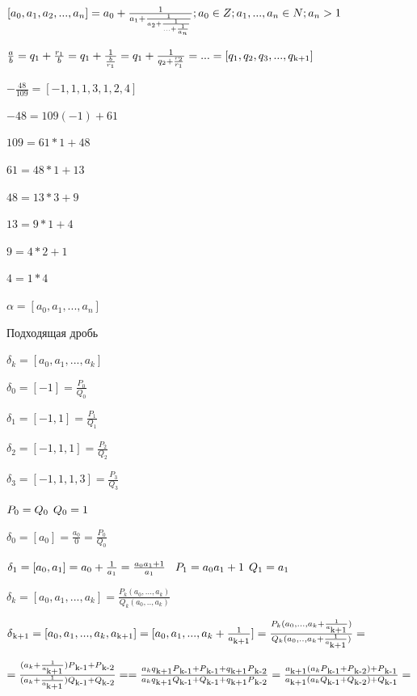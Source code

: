 \documentclass[12pt]{article}
\begin{document}
$[a_0,a_1,a_2,...,a_n] = a_0 + \frac{1}{a_1 + \frac{1}{a_2 + \frac{1}{... + \frac{1}{a_n}}}}; a_0 \in Z; a_1,...,a_n \in N; a_n > 1
\vspace{1 ex}$

$\frac{a}{b} = q_1 + \frac{r_1}{b} = q_1 + \frac{1}{\frac{b}{r_1}} = q_1 + \frac{1}{q_2 + \frac{r_2}{r_1}} = ... = [q_1,q_2,q_3,...,q\textsubscript{k+1}] \vspace{2 ex}$

$-\frac{48}{109} = [-1,1,1,3,1,2,4] $

$-48 = 109(-1) + 61$

$109 = 61*1 +48$

$61 = 48*1 + 13$

$48 = 13*3 + 9$

$13 = 9*1 + 4$

$9 = 4*2+1$

$4=1*4$

$\alpha = [a_0,a_1,...,a_n]$

Подходящая дробь

$\delta_k = [a_0,a_1,...,a_k]$

$\delta_0 = [-1] = \frac{P_0}{Q_0}$

$\delta_1 = [-1,1] = \frac{P_1}{Q_1}$

$\delta_2 = [-1,1,1] = \frac{P_2}{Q_2}$

$\delta_3 = [-1,1,1,3] = \frac{P_3}{Q_3}$

$P_0 = Q_0 \hspace{1 ex } Q_0 = 1$

$\delta_0 = [a_0] = \frac{a_0}{0} = \frac{P_0}{Q_0}$

$\delta_1 = [a_0, a_1] = a_0 + \frac{1}{a_1} = \frac{a_0 a_1 +1}{a_1} \hspace{2 ex} P_1 = a_0 a_1 +1 \hspace{1 ex} Q_1 = a_1$

$\delta_k = [a_0,a_1,...,a_k] = \frac{P_k(a_0,...,a_k)}{Q_k(a_0,..,a_k)}$

$\delta\textsubscript{k+1} = [a_0,a_1,...,a_k,a\textsubscript{k+1}] =[a_0,a_1,...,a_k+\frac{1}{ a\textsubscript{k+1}}] =  \frac{P_k(a_0,...,a_k+\frac{1}{ a\textsubscript{k+1}} )}{Q_k(a_0,..,a_k+\frac{1}{ a\textsubscript{k+1}})} = \vspace{2 ex}$

$= \frac{(a_k + \frac{1}{a\textsubscript{k+1}}) P\textsubscript{k-1} + P\textsubscript{k-2}}{(a_k + \frac{1}{a\textsubscript{k+1}}) Q\textsubscript{k-1} + Q\textsubscript{k-2}} =
= \frac{a_k q\textsubscript{k+1} P\textsubscript{k-1} + P\textsubscript{k-1} + q\textsubscript{k+1} P\textsubscript{k-2}}{a_k q\textsubscript{k+1} Q\textsubscript{k-1} + Q\textsubscript{k-1} + q\textsubscript{k+1} P\textsubscript{k-2}} = \frac{a\textsubscript{k+1} (a_k P\textsubscript{k-1} + P\textsubscript{k-2}) + P\textsubscript{k-1}}{a\textsubscript{k+1} (a_k Q\textsubscript{k-1} + Q\textsubscript{k-2}) + Q\textsubscript{k-1}} = $
\end{document}
